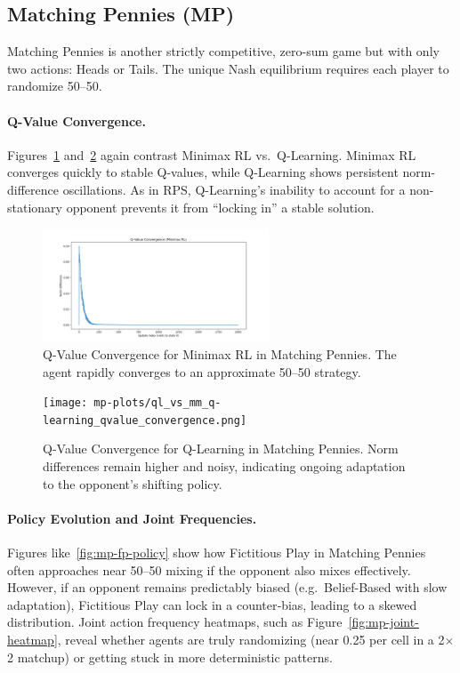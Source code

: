 \documentclass[11pt]{article}
\begin{document}
\subsection{Matching Pennies (MP)}

Matching Pennies is another strictly competitive, zero-sum game but with 
only two actions: Heads or Tails. The unique Nash equilibrium requires 
each player to randomize 50--50.

\paragraph{Q-Value Convergence.}
Figures~\ref{fig:mp-minimax-convergence} and~\ref{fig:mp-ql-convergence} 
again contrast Minimax RL vs.\ Q-Learning. Minimax RL converges quickly 
to stable Q-values, while Q-Learning shows persistent norm-difference 
oscillations. As in RPS, Q-Learning's inability to account for a 
non-stationary opponent prevents it from ``locking in'' a stable solution.

\begin{figure}[htbp]
    \centering
    \includegraphics[width=0.6\textwidth]{mp-plots/ql_vs_mm_minimax_rl_qvalue_convergence.png}
    \caption{Q-Value Convergence for Minimax RL in Matching Pennies. The 
    agent rapidly converges to an approximate 50--50 strategy.}
    \label{fig:mp-minimax-convergence}
\end{figure}

\begin{figure}[htbp]
    \centering
    \texttt{[image: mp-plots/ql\_vs\_mm\_q-learning\_qvalue\_convergence.png]}
    \caption{Q-Value Convergence for Q-Learning in Matching Pennies. 
    Norm differences remain higher and noisy, indicating ongoing 
    adaptation to the opponent's shifting policy.}
    \label{fig:mp-ql-convergence}
\end{figure}

\paragraph{Policy Evolution and Joint Frequencies.}
Figures like~\ref{fig:mp-fp-policy} show how Fictitious Play in 
Matching Pennies often approaches near 50--50 mixing if the opponent also 
mixes effectively. However, if an opponent remains predictably biased 
(e.g.\ Belief-Based with slow adaptation), Fictitious Play can lock in a 
counter‐bias, leading to a skewed distribution. Joint action frequency 
heatmaps, such as Figure~\ref{fig:mp-joint-heatmap}, reveal whether 
agents are truly randomizing (near 0.25 per cell in a 2$\times$2 
matchup) or getting stuck in more deterministic patterns.
\end{document}
